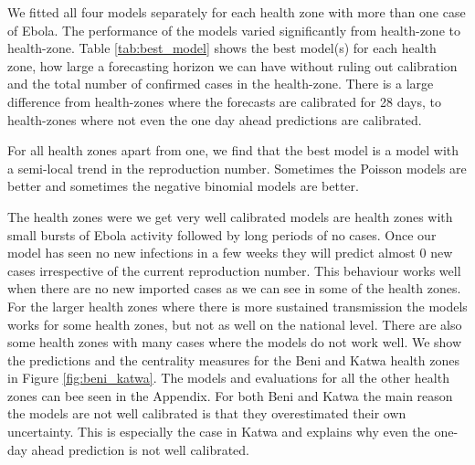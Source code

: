 \documentclass[12pt]{article}
\begin{document}
We fitted all four models separately for each health zone with more than one case of Ebola. The performance of the models varied significantly from health-zone to health-zone. Table \ref{tab:best_model} shows the best model(s) for each health zone, how large a forecasting horizon we can have without ruling out calibration and the total number of confirmed cases in the health-zone. There is a large difference from health-zones where the forecasts are calibrated for 28 days, to health-zones where not even the one day ahead predictions are calibrated.



For all health zones apart from one, we find that the best model is a model with a semi-local trend in the reproduction number. Sometimes the Poisson models are better and sometimes the negative binomial models are better.

The health zones were we get very well calibrated models are health zones with small bursts of Ebola activity followed by long periods of no cases. Once our model has seen no new infections in a few weeks they will predict almost 0 new cases irrespective of the current reproduction number. This behaviour works well when there are no new imported cases as we can see in some of the health zones. For the larger health zones where there is more sustained transmission the models works for some health zones, but not as well on the national level. There are also some health zones with many cases where the models do not work well. We show the predictions and the centrality measures for the Beni and Katwa health zones in Figure \ref{fig:beni_katwa}. The models and evaluations for all the other health zones can bee seen in the Appendix. For both Beni and Katwa the main reason the models are not well calibrated is that they overestimated their own uncertainty. This is especially the case in Katwa and explains why even the one-day ahead prediction is not well calibrated. 
\end{document}
